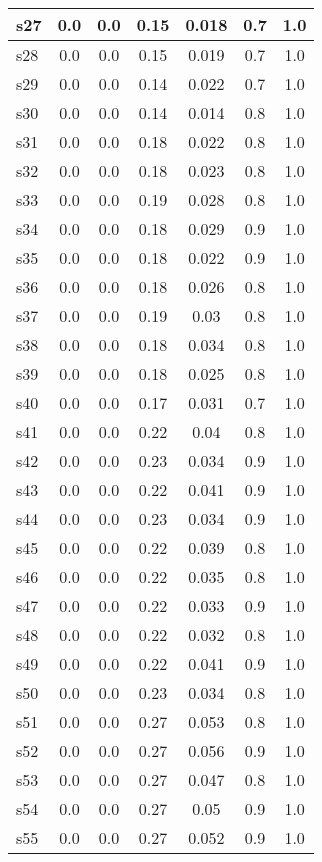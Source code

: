 \documentclass{article}
\begin{document}
\begin{tabular}{|l|c|c|c|c|c|c|}
\hline
s27 &0.0 & 0.0 & 0.15 & 0.018 & 0.7 & 1.0\\
\hline
s28 &0.0 & 0.0 & 0.15 & 0.019 & 0.7 & 1.0\\
\hline
s29 &0.0 & 0.0 & 0.14 & 0.022 & 0.7 & 1.0\\
\hline
s30 &0.0 & 0.0 & 0.14 & 0.014 & 0.8 & 1.0\\
\hline
s31 &0.0 & 0.0 & 0.18 & 0.022 & 0.8 & 1.0\\
\hline
s32 &0.0 & 0.0 & 0.18 & 0.023 & 0.8 & 1.0\\
\hline
s33 &0.0 & 0.0 & 0.19 & 0.028 & 0.8 & 1.0\\
\hline
s34 &0.0 & 0.0 & 0.18 & 0.029 & 0.9 & 1.0\\
\hline
s35 &0.0 & 0.0 & 0.18 & 0.022 & 0.9 & 1.0\\
\hline
s36 &0.0 & 0.0 & 0.18 & 0.026 & 0.8 & 1.0\\
\hline
s37 &0.0 & 0.0 & 0.19 & 0.03 & 0.8 & 1.0\\
\hline
s38 &0.0 & 0.0 & 0.18 & 0.034 & 0.8 & 1.0\\
\hline
s39 &0.0 & 0.0 & 0.18 & 0.025 & 0.8 & 1.0\\
\hline
s40 &0.0 & 0.0 & 0.17 & 0.031 & 0.7 & 1.0\\
\hline
s41 &0.0 & 0.0 & 0.22 & 0.04 & 0.8 & 1.0\\
\hline
s42 &0.0 & 0.0 & 0.23 & 0.034 & 0.9 & 1.0\\
\hline
s43 &0.0 & 0.0 & 0.22 & 0.041 & 0.9 & 1.0\\
\hline
s44 &0.0 & 0.0 & 0.23 & 0.034 & 0.9 & 1.0\\
\hline
s45 &0.0 & 0.0 & 0.22 & 0.039 & 0.8 & 1.0\\
\hline
s46 &0.0 & 0.0 & 0.22 & 0.035 & 0.8 & 1.0\\
\hline
s47 &0.0 & 0.0 & 0.22 & 0.033 & 0.9 & 1.0\\
\hline
s48 &0.0 & 0.0 & 0.22 & 0.032 & 0.8 & 1.0\\
\hline
s49 &0.0 & 0.0 & 0.22 & 0.041 & 0.9 & 1.0\\
\hline
s50 &0.0 & 0.0 & 0.23 & 0.034 & 0.8 & 1.0\\
\hline
s51 &0.0 & 0.0 & 0.27 & 0.053 & 0.8 & 1.0\\
\hline
s52 &0.0 & 0.0 & 0.27 & 0.056 & 0.9 & 1.0\\
\hline
s53 &0.0 & 0.0 & 0.27 & 0.047 & 0.8 & 1.0\\
\hline
s54 &0.0 & 0.0 & 0.27 & 0.05 & 0.9 & 1.0\\
\hline
s55 &0.0 & 0.0 & 0.27 & 0.052 & 0.9 & 1.0\\

\end{tabular}
\end{document}
